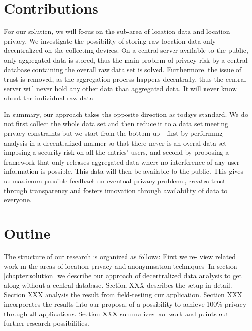 \section{Contributions}
For our solution, we will focus on the sub-area of location data and location privacy.
We investigate the possibility of storing raw location data only decentralized on the collecting devices. On a central server available to the public, only aggregated data is stored, thus the main problem of privacy risk by a central database containing the overall raw data set is solved. Furthermore, the issue of trust is removed, as the aggregation process happens decentrally, thus the central server will never hold any other data than aggregated data. It will never know about the individual raw data.

In summary, our approach takes the opposite direction as todays standard. We do not first collect the whole data set and then reduce it to a data set meeting privacy-constraints but we start from the bottom up - first by performing analysis in a decentralized manner so that there never is an overal data set imposing a security risk on all the entries' users, and second by proposing a framework that only releases aggregated data where no interference of any user information is possible. This data will then be available to the public. This gives us maximum possible feedback on eventual privacy problems, creates trust through transparency and fosters innovation through availability of data to everyone.


\section{Outine}
The structure of our research is organized as follows: First we re-
view related work in the areas of location privacy and anonymisation techniques. In
section \ref{chapter:solution} we describe our approach of decentralized data analysis to get along without a central database.
Section XXX describes the setup in detail. Section XXX analysis the result from field-testing our application.
Section XXX incorporates the results into our proposal of a possibility to achieve 100\% privacy through all applications.
Section XXX summarizes our work and points out further research possibilities.

